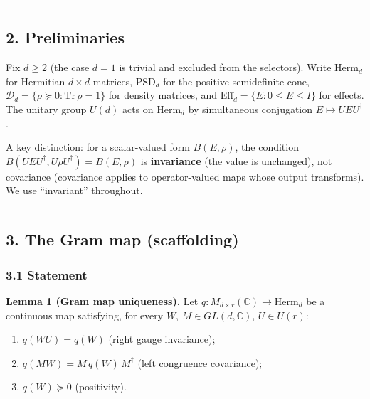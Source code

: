 \documentclass[
]{article}
\providecommand{\tightlist}{%
  \setlength{\itemsep}{0pt}\setlength{\parskip}{0pt}}
\begin{document}
\begin{center}\rule{0.5\linewidth}{0.5pt}\end{center}

\subsection{2. Preliminaries}\label{preliminaries}

Fix \(d\geq 2\) (the case \(d=1\) is trivial and excluded from the
selectors). Write \(\mathrm{Herm}_d\) for Hermitian \(d\times d\)
matrices, \(\mathrm{PSD}_d\) for the positive semidefinite cone,
\(\mathcal D_d=\{\rho\succeq 0:\mathrm{Tr}\,\rho=1\}\) for density
matrices, and \(\mathrm{Eff}_d=\{E:0\leq E\leq I\}\) for effects. The
unitary group \(U(d)\) acts on \(\mathrm{Herm}_d\) by simultaneous
conjugation \(E\mapsto UEU^\dagger\).

A key distinction: for a scalar-valued form \(B(E,\rho)\), the condition
\(B(UEU^\dagger,U\rho U^\dagger)=B(E,\rho)\) is \textbf{invariance} (the
value is unchanged), not covariance (covariance applies to
operator-valued maps whose output transforms). We use ``invariant''
throughout.

\begin{center}\rule{0.5\linewidth}{0.5pt}\end{center}

\subsection{3. The Gram map
(scaffolding)}\label{the-gram-map-scaffolding}

\subsubsection{3.1 Statement}\label{statement}

\textbf{Lemma 1 (Gram map uniqueness).} Let
\(q:M_{d\times r}(\mathbb C)\to\mathrm{Herm}_d\) be a continuous map
satisfying, for every \(W\), \(M\in GL(d,\mathbb C)\), \(U\in U(r)\):

\begin{enumerate}
\def\labelenumi{\arabic{enumi}.}
\tightlist
\item
  \(q(WU)=q(W)\) (right gauge invariance);
\item
  \(q(MW)=M\,q(W)\,M^\dagger\) (left congruence covariance);
\item
  \(q(W)\succeq 0\) (positivity).
\end{enumerate}
\end{document}
